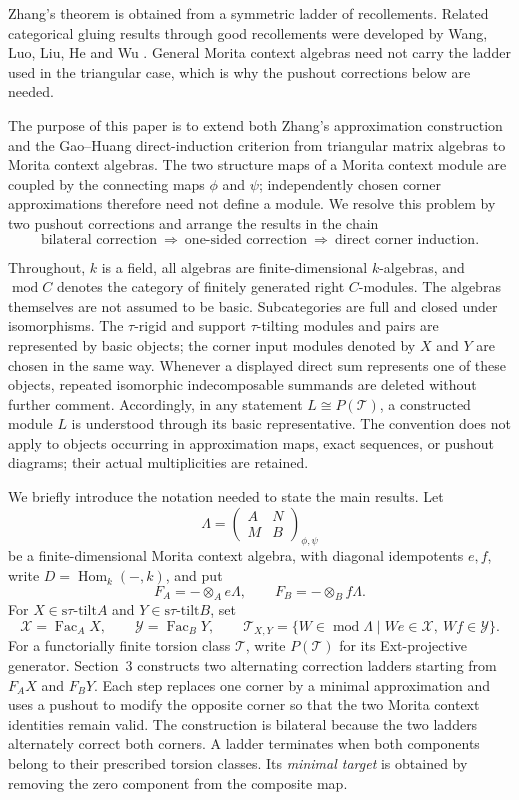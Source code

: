\documentclass[11pt,reqno]{amsart}
\theoremstyle{definition}
\theoremstyle{remark}
\newcommand{\modu}{\operatorname{mod}}
\newcommand{\Fac}{\operatorname{Fac}}
\newcommand{\Hom}{\operatorname{Hom}}
\newcommand{\stau}{\mathrm{s}\tau\text{-}\mathrm{tilt}}
\numberwithin{equation}{section}
\begin{document}
Zhang's theorem is obtained from a symmetric ladder of recollements.
Related categorical gluing results through good recollements were developed
by Wang, Luo, Liu, He and Wu \cite{WangLuoLiuHeWu}.  General Morita context
algebras need not carry the ladder used in the triangular case, which is why
the pushout corrections below are needed.

The purpose of this paper is to extend both Zhang's approximation construction
and the Gao--Huang direct-induction criterion from triangular matrix algebras
to Morita context algebras.  The two structure maps of a Morita context module
are coupled by the connecting maps $\phi$ and $\psi$; independently chosen
corner approximations therefore need not define a module.  We resolve this
problem by two pushout corrections and arrange the results in the chain
\[
 \text{bilateral correction}
 \ \Longrightarrow\ \text{one-sided correction}
 \ \Longrightarrow\ \text{direct corner induction}.
\]

Throughout, $k$ is a field, all algebras are finite-dimensional
$k$-algebras, and $\modu C$ denotes the category of finitely generated
right $C$-modules.  The algebras themselves are not assumed to be basic.
Subcategories are full and closed under isomorphisms.
The $\tau$-rigid and support $\tau$-tilting modules and
pairs are represented by basic objects;
the corner input modules denoted by $X$ and $Y$ are chosen in the same way.
Whenever a displayed direct sum represents one of these objects, repeated
isomorphic indecomposable summands are deleted without further comment.
Accordingly, in any statement $L\cong P(\mathcal T)$, a constructed module
$L$ is understood through its basic representative.  The convention does not
apply to objects occurring in approximation maps, exact sequences, or pushout
diagrams; their actual multiplicities are retained.

We briefly introduce the notation needed to state the main results.  Let
\[
 \Lambda=\begin{pmatrix}A&N\\M&B\end{pmatrix}_{\phi,\psi}
\]
be a finite-dimensional Morita context algebra, with diagonal idempotents
$e,f$, write $D=\Hom_k(-,k)$, and put
\[
 F_A=-\otimes_Ae\Lambda,
 \qquad F_B=-\otimes_Bf\Lambda.
\]
For $X\in\stau A$ and $Y\in\stau B$, set
\[
 \mathcal X=\Fac_AX,\qquad \mathcal Y=\Fac_BY,\qquad
 \mathcal T_{X,Y}=\{W\in\modu\Lambda\mid We\in\mathcal X,
                                      \ Wf\in\mathcal Y\}.
\]
For a functorially finite torsion class $\mathcal T$, write $P(\mathcal T)$
for its Ext-projective generator.
Section~3 constructs two alternating correction ladders starting from
$F_AX$ and $F_BY$.  Each step replaces one corner by a minimal approximation
and uses a pushout to modify the opposite corner so that the two Morita
context identities remain valid.  The construction is bilateral because the
two ladders alternately correct both corners.  A ladder terminates when both
components belong to their prescribed torsion classes.  Its \emph{minimal
target} is obtained by removing the zero component from the composite map.
\end{document}
